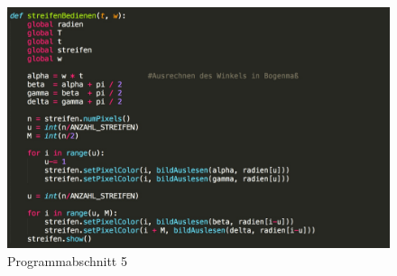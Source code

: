 \documentclass [a4paper, 11pt] {article}
\begin{document}
\begin{figure}[h]
	\centering
	\includegraphics[width=16cm]{P5.png}
	\caption{Programmabschnitt 5}
\end{figure} 
\end{document}

